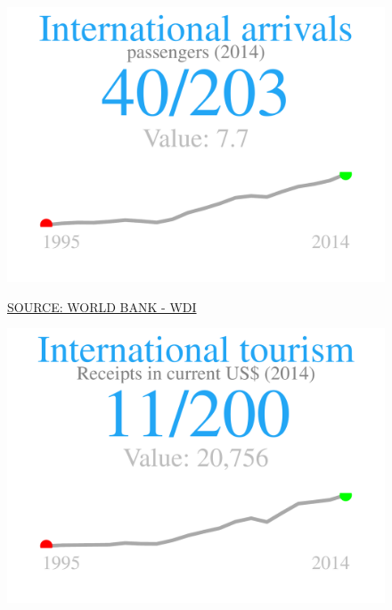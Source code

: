 \documentclass{article}\usepackage[]{graphicx}\usepackage[]{color}
\makeatletter
\def\maxwidth{ %
  \ifdim\Gin@nat@width>\linewidth
    \linewidth
  \else
    \Gin@nat@width
  \fi
}
\makeatother
\begin{document}
\begin{figure}
\begin{minipage}[t]{0.99\textwidth}
\begin{minipage}[t]{0.56\textwidth}
\begin{minipage}[c]{0.30\textwidth}
\hfill{}\includegraphics[width=\maxwidth]{figure/figure_sparkline1-1} 



    \vspace{-2ex}
    \hspace{2ex}\tiny{\href{http://data.worldbank.org/data-catalog/world-development-indicators}{\textcolor[HTML]{722FF5}{SOURCE: WORLD BANK - WDI}}}
    \vspace{3ex}
    \end{minipage}
    \begin{minipage}[c]{0.30\textwidth}


{\centering \includegraphics[width=\maxwidth]{figure/figure_sparkline2-1} 

}




\end{minipage}
\end{minipage}
\end{minipage}
\end{figure}
\end{document}
